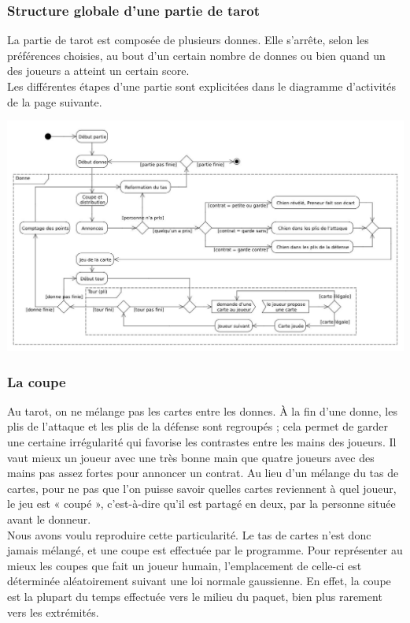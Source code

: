 \documentclass[a4paper]{report}
\begin{document}
			\subsubsection{Structure globale d’une partie de tarot}
				La partie de tarot est composée de plusieurs donnes. Elle s’arrête, selon les préférences choisies, au bout d’un certain nombre de donnes ou bien quand un des joueurs a 					atteint un certain score.\\
				Les différentes étapes d’une partie sont explicitées dans le diagramme d’activités de la page suivante.
			\begin{center}
				\includegraphics[scale=0.52,angle=90]{Images/flow.jpg}
			\end{center}
			
			\subsubsection{La coupe}	
				Au tarot, on ne mélange pas les cartes entre les donnes. À la fin d’une donne, les plis de l’attaque et les plis de la défense sont regroupés ; cela permet de garder une 					certaine irrégularité qui favorise les contrastes entre les mains des joueurs. Il vaut mieux un joueur avec une très bonne main que quatre joueurs avec des mains pas 					assez fortes pour annoncer un contrat. Au lieu d’un mélange du tas de cartes, pour ne pas que l’on puisse savoir quelles cartes reviennent à quel joueur, le jeu est « 					coupé », c’est-à-dire qu’il est partagé en deux, par la personne située avant le donneur.\\
					Nous avons voulu reproduire cette particularité. Le tas de cartes n’est donc jamais mélangé, et une coupe est effectuée par le programme. Pour représenter au 					mieux les coupes que fait un joueur humain, l’emplacement de celle-ci est déterminée aléatoirement suivant une loi normale gaussienne. En effet, la coupe est la plupart 					du temps effectuée vers le milieu du paquet, bien plus rarement vers les extrémités.\\
				\newpage
\end{document}
